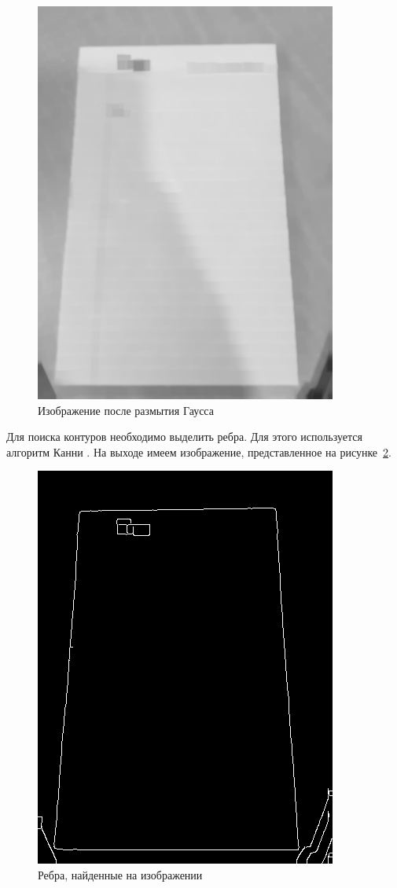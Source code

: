 \begin{figure}
    \includegraphics[scale=0.25]{img/perspective/blured.png}
    \caption{Изображение после размытия Гаусса}
    \label{gauss_blur}
\end{figure}

Для поиска контуров необходимо выделить ребра. Для этого используется алгоритм Канни \cite{canny}. На выходе имеем изображение, представленное на рисунке~\ref{canny}.
\begin{figure}
    \includegraphics[scale=0.25]{img/perspective/canny.png}
    \caption{Ребра, найденные на изображении}
    \label{canny}
\end{figure}

